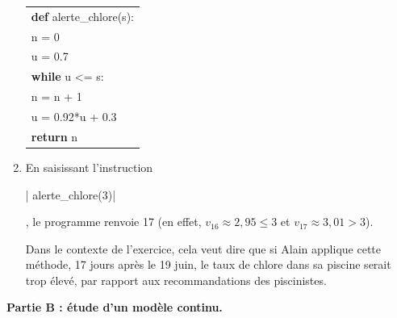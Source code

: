 \documentclass[10pt]{article}
\begin{document}
\begin{enumerate}
	\begin{center}
	\begin{tabular}{|l|}\hline
		\textbf{def} alerte\_chlore(s):\\
		\qquad n = 0\\
		\qquad u = 0.7\\
		\qquad \textbf{while} u <= s:\\
		\qquad \qquad n = n + 1 \\
		\qquad \qquad u = 0.92*u + 0.3\\
		\qquad \textbf{return} n\\ \hline
	\end{tabular}
\end{center}

	\item En saisissant l'instruction {\begin{Verb}| alerte_chlore(3)|\end{Verb}}, le programme renvoie 17 (en effet, $v_{16}\approx 2,95 \leqslant 3$ et $v_{17} \approx 3,01 > 3$).

Dans le contexte de l'exercice, cela veut dire que si Alain applique cette méthode, 17 jours après le 19 juin, le taux de chlore dans sa piscine serait trop élevé, par rapport aux recommandations des piscinistes.
\end{enumerate}

\medskip

\textbf{Partie B : étude d'un modèle continu.}

\smallskip
\end{document}
